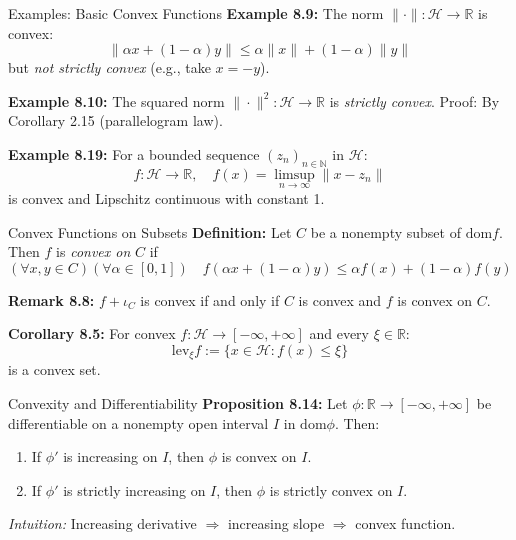 \documentclass[aspectratio=169,10pt]{beamer}
\begin{document}
\begin{frame}[fragile]{Examples: Basic Convex Functions}
    \textbf{Example 8.9:} The norm $\| \cdot \| : \mathcal{H} \to \mathbb{R}$ is convex:
    \[
    \|\alpha x + (1-\alpha) y\| \leq \alpha \|x\| + (1-\alpha)\|y\|
    \]
    but \textit{not strictly convex} (e.g., take $x = -y$).

    \vspace{0.3cm}

    \textbf{Example 8.10:} The squared norm $\| \cdot \|^2 : \mathcal{H} \to \mathbb{R}$ is \textit{strictly convex}.
    Proof: By Corollary 2.15 (parallelogram law).

    \vspace{0.3cm}

    \textbf{Example 8.19:} For a bounded sequence $(z_n)_{n \in \mathbb{N}}$ in $\mathcal{H}$:
    \[
    f : \mathcal{H} \to \mathbb{R}, \quad f(x) = \limsup_{n \to \infty} \|x - z_n\|
    \]
    is convex and Lipschitz continuous with constant 1.
\end{frame}

\begin{frame}[fragile]{Convex Functions on Subsets}
    \textbf{Definition:} Let $C$ be a nonempty subset of $\text{dom} f$. Then $f$ is \textit{convex on} $C$ if
    \[
    (\forall x, y \in C)(\forall \alpha \in [0,1]) \quad f(\alpha x + (1-\alpha)y) \leq \alpha f(x) + (1-\alpha)f(y)
    \]

    \vspace{0.3cm}

    \textbf{Remark 8.8:} $f + \iota_C$ is convex if and only if $C$ is convex and $f$ is convex on $C$.

    \vspace{0.3cm}

    \textbf{Corollary 8.5:} For convex $f : \mathcal{H} \to [-\infty, +\infty]$ and every $\xi \in \mathbb{R}$:
    \[
    \text{lev}_\xi f := \{x \in \mathcal{H} : f(x) \leq \xi\}
    \]
    is a convex set.
\end{frame}

\begin{frame}[fragile]{Convexity and Differentiability}
    \textbf{Proposition 8.14:} Let $\phi : \mathbb{R} \to [-\infty, +\infty]$ be differentiable on a nonempty open interval $I$ 
    in $\text{dom} \phi$. Then:
    
    \begin{enumerate}
        \item If $\phi'$ is increasing on $I$, then $\phi$ is convex on $I$.
        \item If $\phi'$ is strictly increasing on $I$, then $\phi$ is strictly convex on $I$.
    \end{enumerate}

    \vspace{0.3cm}

    \textit{Intuition:} Increasing derivative $\Rightarrow$ increasing slope $\Rightarrow$ convex function.
\end{frame}
\end{document}
